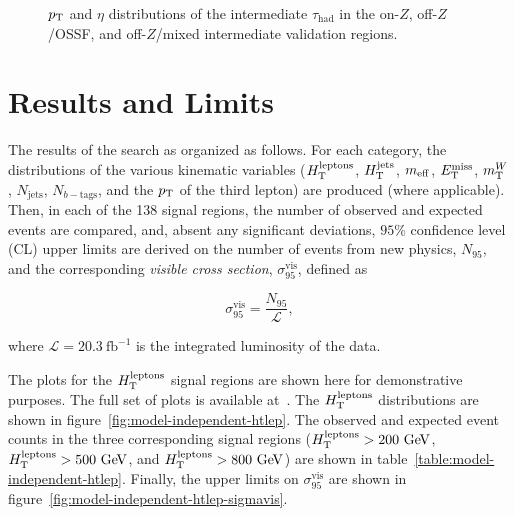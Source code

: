 \begin{figure}[tbp]

  \caption{$p_{\text{T}}$ and $\eta$ distributions of the intermediate $\tau_{\mathrm{had}}$ in the on-$Z$, off-$Z$/OSSF, and off-$Z$/mixed intermediate validation regions. }
  \label{fig:model-independent-VR-intermediate-tau}
\end{figure}


\section{Results and Limits}\label{sec:model-independent-results}
The results of the search as organized as follows. For each category, the distributions of the various kinematic variables ($H_{\mathrm{T}}^{\mathrm{leptons}}$, $H_{\mathrm{T}}^{\mathrm{jets}}$, $m_{\mathrm{eff}}$, $E_{\text{T}}^{\text{miss}}$, $m_{\mathrm{T}}^W$, $N_{\mathrm{jets}}$, $N_{b-\mathrm{tags}}$, and the $p_{\text{T}}$ of the third lepton) are produced (where applicable). Then, in each of the 138 signal regions, the number of observed and expected events are compared, and, absent any significant deviations, $95\%$ confidence level (CL) upper limits are derived on the number of events from new physics, $N_{95}$, and the corresponding \emph{visible cross section}, $\sigma_{95}^{\mathrm{vis}}$, defined as

\begin{equation}
	\sigma_{95}^{\mathrm{vis}} = \frac{N_{95}}{\mathcal{L}},
\end{equation}

where $\mathcal{L}=20.3~\mbox{fb}^{-1}$ is the integrated luminosity of the data.

The plots for the $H_{\mathrm{T}}^{\mathrm{leptons}}$ signal regions are shown here for demonstrative purposes. The full set of plots is available at~\cite{model-independent-webpage}. The $H_{\mathrm{T}}^{\mathrm{leptons}}$ distributions are shown in figure~\ref{fig:model-independent-htlep}. The observed and expected event counts in the three corresponding signal regions ($\htlep>200 \GeV$, $\htlep>500 \GeV$, and $\htlep>800 \GeV$) are shown in table~\ref{table:model-independent-htlep}. Finally, the upper limits on $\sigma_{95}^{\mathrm{vis}}$ are shown in figure~\ref{fig:model-independent-htlep-sigmavis}. 

